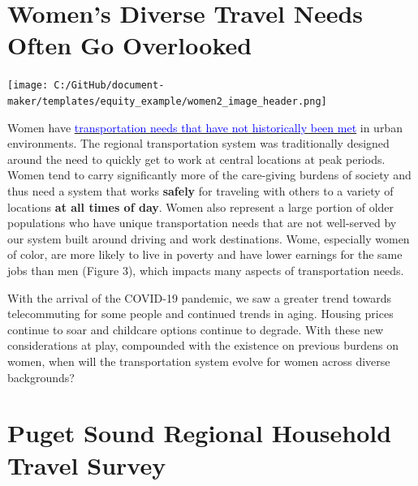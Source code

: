 \documentclass[
  12pt,
]{article}
\author{}
\date{\vspace{-2.5em}}
\begin{document}
\hypertarget{womens-diverse-travel-needs-often-go-overlooked}{%
\section{Women's Diverse Travel Needs Often Go
Overlooked}\label{womens-diverse-travel-needs-often-go-overlooked}}

\onehalfspacing

\texttt{[image: C:/GitHub/document-maker/templates/equity\_example/women2\_image\_header.png]}

\thispagestyle{firstpage}

\begin{flushleft}
Women have \href{http://libraryarchives.metro.net/DB_Attachments/2019-0294/UnderstandingHowWomenTravel_FullReport_FINAL.pdf}{\underline{\textcolor{blue}{transportation needs that have not historically been met}}} in urban environments.  The regional transportation system was traditionally designed around the need to quickly get to work at central locations at peak periods. Women tend to carry significantly more of the care-giving burdens of society and thus need a system that works \textbf{safely} for traveling with others to a variety of locations \textbf{at all times of day}. Women also represent a large portion of older populations who have unique transportation needs that are not well-served by our system built around driving and work destinations. Wome, especially women of color, are more likely to live in poverty and have lower earnings for the same jobs than men (Figure 3), which impacts many aspects of transportation needs.
\end{flushleft}

\begin{flushleft}
With the arrival of the COVID-19 pandemic, we saw a greater trend towards telecommuting for some people and continued trends in aging. Housing prices continue to soar and childcare options continue to degrade. With these new considerations at play, compounded with the existence on previous burdens on women, when will the transportation system evolve for women across diverse backgrounds?
\end{flushleft}

\newpage
\pagestyle{otherpages}
\setlength{\headheight}{10pt}
\setlength{\textheight}{665pt}
\fancyhead[L]{}

\hypertarget{puget-sound-regional-household-travel-survey}{%
\section{Puget Sound Regional Household Travel
Survey}\label{puget-sound-regional-household-travel-survey}}
\end{document}
